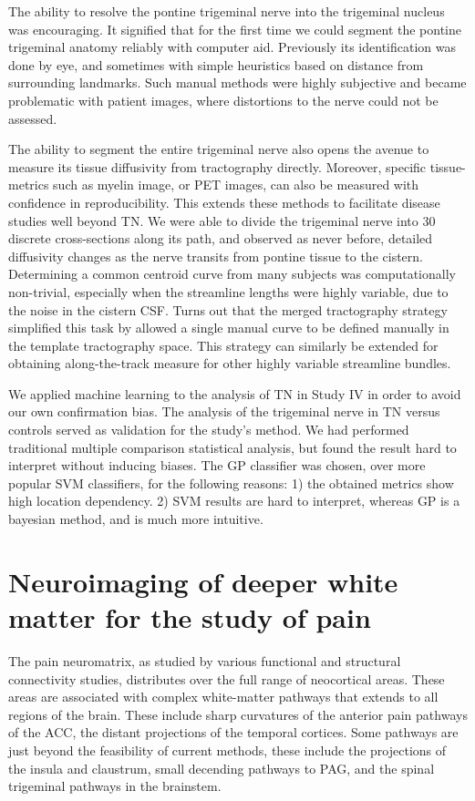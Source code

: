 The ability to resolve the pontine trigeminal nerve into the trigeminal nucleus was encouraging. It signified that for the first time we could segment the pontine trigeminal anatomy reliably with computer aid. Previously its identification was done by eye, and sometimes with simple heuristics based on distance from surrounding landmarks. Such manual methods were highly subjective and became problematic with patient images, where distortions to the nerve could not be assessed. 

The ability to segment the entire trigeminal nerve also opens the avenue to measure its tissue diffusivity from tractography directly. Moreover, specific tissue-metrics such as myelin image, or PET images, can also be measured with confidence in reproducibility. This extends these methods to facilitate disease studies well beyond TN. We were able to divide the trigeminal nerve into 30 discrete cross-sections along its path, and observed as never before, detailed diffusivity changes as the nerve transits from pontine tissue to the cistern. Determining a common centroid curve from many subjects was computationally non-trivial, especially when the streamline lengths were highly variable, due to the noise in the cistern CSF. Turns out that the merged tractography strategy simplified this task by allowed a single manual curve to be defined manually in the template tractography space. This strategy can similarly be extended for obtaining along-the-track measure for other highly variable streamline bundles.

We applied machine learning to the analysis of TN in Study IV in order to avoid our own confirmation bias. The analysis of the trigeminal nerve in TN versus controls served as validation for the study's method. We had performed traditional multiple comparison statistical analysis, but found the result hard to interpret without inducing biases. The GP classifier was chosen, over more popular SVM classifiers, for the following reasons: 1) the obtained metrics show high location dependency. 2) SVM results are hard to interpret, whereas GP is a bayesian method, and is much more intuitive. 

\section{Neuroimaging of deeper white matter for the study of pain}

The pain neuromatrix, as studied by various functional and structural connectivity studies, distributes over the full range of neocortical areas. These areas are associated with complex white-matter pathways that extends to all regions of the brain. These include sharp curvatures of the anterior pain pathways of the ACC, the distant projections of the temporal cortices. Some pathways are just beyond the feasibility of current methods, these include the projections of the insula and claustrum, small decending pathways to PAG, and the spinal trigeminal pathways in the brainstem.

